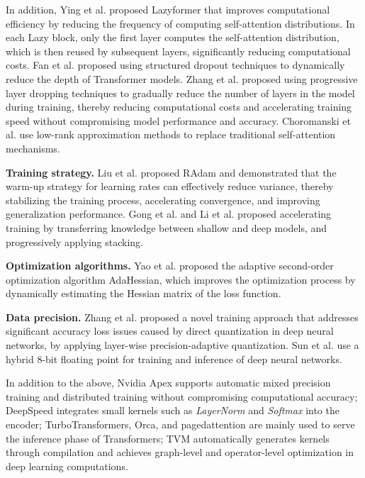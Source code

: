 \documentclass[10pt,twocolumn]{article}
\begin{document}
In addition, Ying et al.\cite{ying2021lazyformer} proposed Lazyformer that improves computational efficiency by reducing the frequency of computing self-attention distributions. 
In each Lazy block, only the first layer computes the self-attention distribution, which is then reused by subsequent layers, significantly reducing computational costs. 
Fan et al.\cite{fan2019reducing} proposed using structured dropout techniques to dynamically reduce the depth of Transformer models. 
Zhang et al.\cite{zhang2020accelerating} proposed using progressive layer dropping techniques to gradually reduce the number of layers in the model during training, thereby reducing computational costs and accelerating training speed without compromising model performance and accuracy. 
Choromanski et al.\cite{choromanski2020rethinking} use low-rank approximation methods to replace traditional self-attention mechanisms.

\noindent\textbf{Training strategy.} Liu et al.\cite{liu2019variance} proposed RAdam and demonstrated that the warm-up strategy for learning rates can effectively reduce variance, thereby stabilizing the training process, accelerating convergence, and improving generalization performance. 
Gong et al.\cite{gong2019efficient} and Li et al.\cite{li2020shallow} proposed accelerating training by transferring knowledge between shallow and deep models, and progressively applying stacking.

\noindent\textbf{Optimization algorithms.} Yao et al.\cite{yao2021adahessian} proposed the adaptive second-order optimization algorithm AdaHessian, which improves the optimization process by dynamically estimating the Hessian matrix of the loss function.

\noindent\textbf{Data precision.} Zhang et al.\cite{zhang2020fixed} proposed a novel training approach that addresses significant accuracy loss issues caused by direct quantization in deep neural networks, by applying layer-wise precision-adaptive quantization. 
Sun et al.\cite{sun2019hybrid} use a hybrid 8-bit floating point for training and inference of deep neural networks.

In addition to the above, Nvidia Apex\cite{nvidia2020apex} supports automatic mixed precision training and distributed training without compromising computational accuracy;
DeepSpeed\cite{rasley2020deepspeed} integrates small kernels such as \textit{LayerNorm} and \textit{Softmax} into the encoder; 
TurboTransformers\cite{fang2021turbotransformers}, Orca\cite{yu2022orca}, and pagedattention\cite{kwon2023efficient} are mainly used to serve the inference phase of Transformers;
TVM\cite{chen2018tvm} automatically generates kernels through compilation and achieves graph-level and operator-level optimization in deep learning computations.
\end{document}
